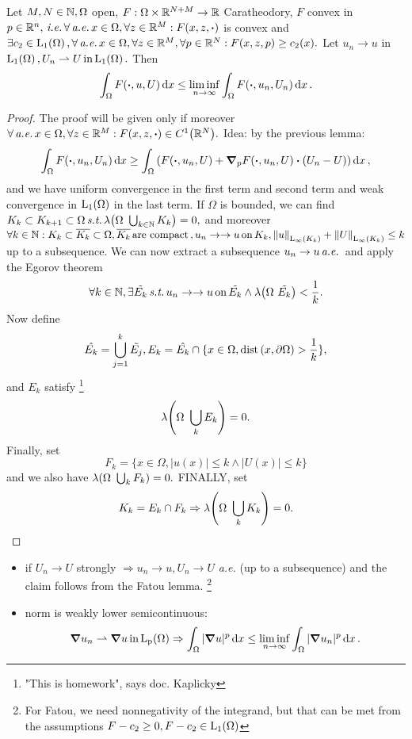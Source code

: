 \documentclass{article}
\begin{document}
\begin{theorem}
    Let $M,N \in {\mathbb N}, \Omega$ open, $F: \Omega \times {\mathbb R}^{N+M} \to {\mathbb R}$ Caratheodory, $F$ convex in $p \in \R^{n}, \, \text{\textit{i.e.}} \, \forall \, \text{\textit{a.e.}} \,x \in \Omega, \forall z \in \R^{M}: F\qty(x,z,\vdot)$ is convex and $\exists c_2 \in \LpSet[1]{\Omega}, \forall\, \text{\textit{a.e.}} \, x \in \Omega, \forall z \in \R^{M}, \forall p \in \R^{N}: F\qty(x,z,p)\geq c_2(x).$ Let $u_n \to u$ in $\LpSet[1]{\Omega}, U_n \rightharpoonup U \, \text{in} \, \LpSet[1]{\Omega}.$ Then
    \[
	    \int_{\Omega}F\qty(\vdot,u,U)\dd{x} \leq \liminf_{n\to \infty} \int_{\Omega}F\qty(\vdot, u_n, U_n) \dd{x}.
    \]
\end{theorem}

\begin{proof}
    The proof will be given only if moreover $\forall \, \text{\textit{a.e.}} \,x \in \Omega, \forall z \in \R^{M}: F\qty(x,z,\vdot) \in C^1\qty(\R^N).$ Idea: by the previous lemma:
    \[
	    \int_{\Omega}F\qty(\vdot, u_n, U_n)\dd{x} \geq \int_{\Omega}\qty(F\qty(\vdot, u_n, U) + \grad_p F\qty(\vdot, u_n, U)\vdot\qty(U_n - U))\dd{x},
    \]
    and we have uniform convergence in the first term and second term and weak convergence in $\LpSet[1]{\Omega}$ in the last term. If $\Omega$ is bounded, we can find $K_k \subset K_{k+1} \subset \Omega \, \text{\textit{s.t.}} \, \lambda\qty(\Omega \ \bigcup_{k \in \N}K_k) = 0,$ and moreover $ \forall k \in {\mathbb N}: K_k \subset \overline{K_k} \subset \Omega, \overline{K_k} \, \text{are compact} \,, u_n \to \to u \, \text{on} \,K_k, \norm{u}_{\text{L}_{\infty}\!\,\left(K_k \right)}+\norm{U}_{\text{L}_{\infty}\!\,\left(K_k \right)}\leq k$ up to a subsequence. We can now extract a subsequence $u_n \to u \, \text{\textit{a.e.}} \,$ and apply the Egorov theorem
    \[
	    \forall k \in {\mathbb N}, \exists \tilde{E_k} \, \text{\textit{s.t.}} \, u_n \to \to u \, \text{on} \, \tilde{E_k}\wedge \lambda\qty(\Omega \ \tilde{E_k})< \frac{1}{k}.
    \]
    Now define
    \[
	    \hat{E_k} = \bigcup_{j=1}^k \tilde{E_j}, E_k = \hat{E_k} \cap \{ x \in \Omega, \operatorname{dist}\qty(x,\partial \Omega) > \frac{1}{k}\},
    \]
    and $E_k$ satisfy \footnote{"This is homework", says doc. Kaplicky}
    \[
	    \lambda\qty(\Omega \ \bigcup_{k}E_k) = 0.
    \]
    Finally, set
    \[
	    F_k = \{x \in \Omega, |u(x)| \leq k \wedge |U(x)| \leq k\}
    \]
    and we also have $\lambda\qty(\Omega \ \bigcup_{k}F_k) = 0.$ FINALLY, set
    \[
	    K_k = E_k \cap F_k \Rightarrow \lambda\qty(\Omega \ \bigcup_{k}K_k)=0.
    \]
\end{proof}
\begin{remark}
\begin{itemize}
\item if $U_n \to U$ strongly $\Rightarrow u_n \to u, U_n \to U$ \textit{a.e.} (up to a subsequence) and the claim follows from the Fatou lemma. \footnote{For Fatou, we need nonnegativity of the integrand, but that can be met from the assumptions $F-c_2 \geq 0, F-c_2 \in \LpSet[1]{\Omega}$}
\item norm is weakly lower semicontinuous:
\[
	\grad u_n \rightharpoonup \grad u \, \text{in} \, \LpSet{\Omega} \Rightarrow \int_{\Omega}|\grad u|^p\dd{x} \leq \liminf_{n \to \infty} \int_{\Omega}|\grad u_n|^p\dd{x}.
\]
\end{itemize}
\end{remark}
\end{document}
